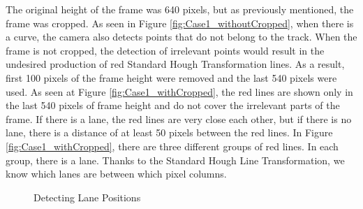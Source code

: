 The original height of the frame was 640 pixels, but as previously mentioned, the frame was cropped. As seen in Figure \ref{fig:Case1_withoutCropped}, when there is a curve, the camera also detects points that do not belong to the track. When the frame is not cropped, the detection of irrelevant points would result in the undesired production of red Standard Hough Transformation lines. As a result, first 100 pixels of the frame height were removed and the last 540 pixels were used. As seen at Figure \ref{fig:Case1_withCropped}, the red lines are shown only in the last 540 pixels of frame height and do not cover the irrelevant parts of the frame. If there is a lane, the red lines are very close each other, but if there is no lane, there is a distance of at least 50 pixels between the red lines. In Figure \ref{fig:Case1_withCropped}, there are three different groups of red lines. In each group, there is a lane. Thanks to the Standard Hough Line Transformation, we know which lanes are between which pixel columns.

\begin{figure}[H]
  \centering
  \hfill
  \caption{Detecting Lane Positions}
\end{figure}


